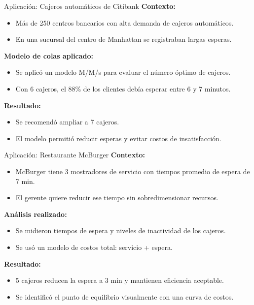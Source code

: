 \documentclass{beamer}
\begin{document}
\begin{frame}{Aplicación: Cajeros automáticos de Citibank}
\textbf{Contexto:}
\begin{itemize}
    \item Más de 250 centros bancarios con alta demanda de cajeros automáticos.
    \item En una sucursal del centro de Manhattan se registraban largas esperas.
\end{itemize}

\textbf{Modelo de colas aplicado:}
\begin{itemize}
    \item Se aplicó un modelo M/M/s para evaluar el número óptimo de cajeros.
    \item Con 6 cajeros, el 88\% de los clientes debía esperar entre 6 y 7 minutos.
\end{itemize}

\textbf{Resultado:}
\begin{itemize}
    \item Se recomendó ampliar a 7 cajeros.
    \item El modelo permitió reducir esperas y evitar costos de insatisfacción.
\end{itemize}
\end{frame}

\begin{frame}{Aplicación: Restaurante McBurger}
\textbf{Contexto:}
\begin{itemize}
    \item McBurger tiene 3 mostradores de servicio con tiempos promedio de espera de 7 min.
    \item El gerente quiere reducir ese tiempo sin sobredimensionar recursos.
\end{itemize}

\textbf{Análisis realizado:}
\begin{itemize}
    \item Se midieron tiempos de espera y niveles de inactividad de los cajeros.
    \item Se usó un modelo de costos total: servicio + espera.
\end{itemize}

\textbf{Resultado:}
\begin{itemize}
    \item 5 cajeros reducen la espera a 3 min y mantienen eficiencia aceptable.
    \item Se identificó el punto de equilibrio visualmente con una curva de costos.
\end{itemize}
\end{frame}
\end{document}
